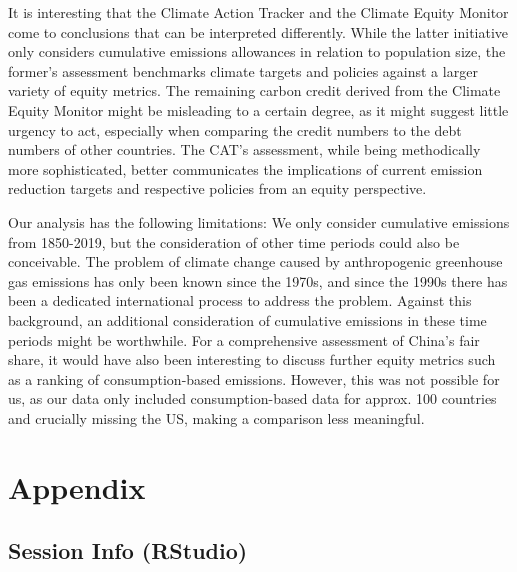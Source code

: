 \documentclass[
  12pt,
]{article}
\numberwithin{equation}{section}
\numberwithin{table}{section}
\numberwithin{figure}{section}
\begin{document}
It is interesting that the Climate Action Tracker and the Climate Equity
Monitor come to conclusions that can be interpreted differently. While
the latter initiative only considers cumulative emissions allowances in
relation to population size, the former's assessment benchmarks climate
targets and policies against a larger variety of equity metrics. The
remaining carbon credit derived from the Climate Equity Monitor might be
misleading to a certain degree, as it might suggest little urgency to
act, especially when comparing the credit numbers to the debt numbers of
other countries. The CAT's assessment, while being methodically more
sophisticated, better communicates the implications of current emission
reduction targets and respective policies from an equity perspective.

Our analysis has the following limitations: We only consider cumulative
emissions from 1850-2019, but the consideration of other time periods
could also be conceivable. The problem of climate change caused by
anthropogenic greenhouse gas emissions has only been known since the
1970s, and since the 1990s there has been a dedicated international
process to address the problem. Against this background, an additional
consideration of cumulative emissions in these time periods might be
worthwhile. For a comprehensive assessment of China's fair share, it
would have also been interesting to discuss further equity metrics such
as a ranking of consumption-based emissions. However, this was not
possible for us, as our data only included consumption-based data for
approx. 100 countries and crucially missing the US, making a comparison
less meaningful.

\appendix
\section*{Appendix}
\renewcommand{\thesubsection}{\Alph{subsection}}
\newcommand{\subsectionbreak}{\clearpage\phantomsection}

\normalsize

\hypertarget{session-info-rstudio}{%
\subsection{Session Info (RStudio)}\label{session-info-rstudio}}

\footnotesize
\end{document}
